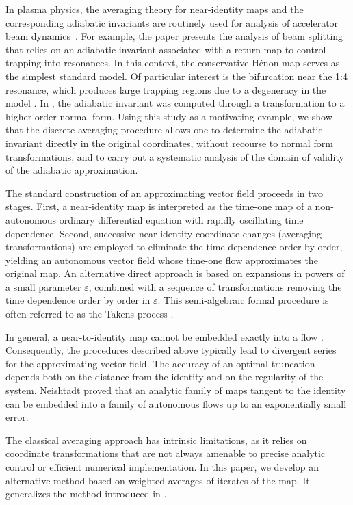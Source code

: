 \documentclass[a4paper,12pt]{article}
\begin{document}
In plasma physics, the averaging theory for near-identity maps and  the corresponding adiabatic invariants are routinely used for analysis of accelerator beam dynamics~\cite{DEF2004}.
For example, 
the paper  \cite{BFGH14} presents the analysis of beam splitting   that relies on an adiabatic invariant associated with a return map to control trapping into resonances. In this context, the conservative Hénon map serves as the simplest standard  model. Of particular interest is the bifurcation near the 1:4 resonance, which produces large trapping regions due to a degeneracy in the model \cite{Bir87}. In \cite{BFGH14}, the adiabatic invariant was computed through a transformation to a higher-order normal form. Using this study as a motivating example,
 we show that the discrete averaging procedure  allows one to determine the adiabatic invariant directly in the original coordinates, without recourse to normal form transformations, and to carry out a systematic analysis of the domain of validity of the adiabatic approximation.

The standard construction of an approximating vector field proceeds in two stages. First, a near-identity map is interpreted as the time-one map of a non-autonomous ordinary differential equation with rapidly oscillating time dependence. Second, successive near-identity coordinate changes (averaging transformations) are employed to eliminate the time dependence order by order, yielding an autonomous vector field whose time-one flow approximates the original map. An alternative direct approach is based on expansions in powers of a small parameter $\varepsilon$, combined with a sequence of transformations removing the time dependence order by order in $\varepsilon$. This semi-algebraic formal procedure is often referred to as the Takens process \cite{Tak74}.

In general, a near-to-identity map cannot be embedded exactly into a flow \cite{Neishtadt84}. Consequently, the procedures described above typically lead to divergent series for the approximating vector field. The accuracy of an optimal truncation depends both on the distance from the identity and on the regularity of the system. Neishtadt \cite{Neishtadt84} proved that an analytic family of maps tangent to the identity can be embedded into a family of autonomous flows up to an exponentially small error.

The classical averaging approach has intrinsic limitations, as it relies on coordinate transformations that are not always amenable to precise analytic control or efficient numerical implementation. In this paper, we develop an alternative method based on weighted averages of iterates of the map. It generalizes the method introduced in \cite{GelfreichV18,GelfreichV26}.
\end{document}
